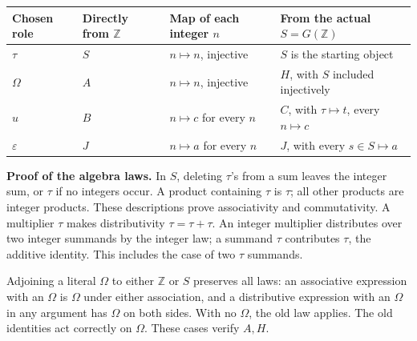 \documentclass[
]{article}
\newcounter{none} %
\begin{document}
{\def\LTcaptype{none} %
\begin{longtable}[]{@{}
  >{\raggedright\arraybackslash}p{}
  >{\raggedright\arraybackslash}p{}
  >{\raggedright\arraybackslash}p{}
  >{\raggedright\arraybackslash}p{}@{}}
\toprule\noalign{}
\begin{minipage}[b]{\linewidth}\raggedright
Chosen role
\end{minipage} & \begin{minipage}[b]{\linewidth}\raggedright
Directly from \(\mathbb Z\)
\end{minipage} & \begin{minipage}[b]{\linewidth}\raggedright
Map of each integer \(n\)
\end{minipage} & \begin{minipage}[b]{\linewidth}\raggedright
From the actual \(S=G(\mathbb Z)\)
\end{minipage} \\
\midrule\noalign{}
\endhead
\bottomrule\noalign{}
\endlastfoot
\(\tau\) & \(S\) & \(n\mapsto n\), injective & \(S\) is the starting
object \\
\(\Omega\) & \(A\) & \(n\mapsto n\), injective & \(H\), with \(S\)
included injectively \\
\(u\) & \(B\) & \(n\mapsto c\) for every \(n\) & \(C\), with
\(\tau\mapsto t\), every \(n\mapsto c\) \\
\(\varepsilon\) & \(J\) & \(n\mapsto a\) for every \(n\) & \(J\), with
every \(s\in S\mapsto a\) \\
\end{longtable}
}

\textbf{Proof of the algebra laws.} In \(S\), deleting \(\tau\)'s from a
sum leaves the integer sum, or \(\tau\) if no integers occur. A product
containing \(\tau\) is \(\tau\); all other products are integer
products. These descriptions prove associativity and commutativity. A
multiplier \(\tau\) makes distributivity \(\tau=\tau+\tau\). An integer
multiplier distributes over two integer summands by the integer law; a
summand \(\tau\) contributes \(\tau\), the additive identity. This
includes the case of two \(\tau\) summands.

Adjoining a literal \(\Omega\) to either \(\mathbb Z\) or \(S\)
preserves all laws: an associative expression with an \(\Omega\) is
\(\Omega\) under either association, and a distributive expression with
an \(\Omega\) in any argument has \(\Omega\) on both sides. With no
\(\Omega\), the old law applies. The old identities act correctly on
\(\Omega\). These cases verify \(A,H\).
\end{document}
